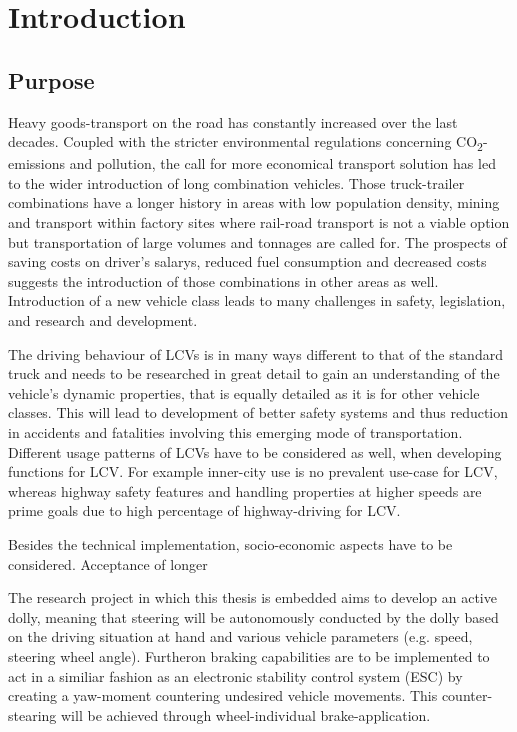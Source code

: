 \documentclass[ExampleMasters.tex]{subfiles}
\begin{document}
\clearpage	
\chapter{Introduction}
\label{chap:introduction}

\section{Purpose}
\label{sec:purpose}
Heavy goods-transport on the road has constantly increased over the last decades. Coupled with the stricter environmental regulations concerning CO\textsubscript{2}-emissions and pollution, the call for more economical transport solution has led to the wider introduction of long combination vehicles. Those truck-trailer combinations have a longer history in areas with low population density, mining and transport within factory sites where rail-road transport is not a viable option but transportation of large volumes and tonnages are called for. The prospects of saving costs on driver's salarys, reduced fuel consumption and decreased costs suggests the introduction of those combinations in other areas as well. Introduction of a new vehicle class leads to many challenges in safety, legislation, and research and development. 

The driving behaviour of LCVs is in many ways different to that of the standard truck and needs to be researched in great detail to gain an understanding of the vehicle's dynamic properties, that is equally detailed as it is for other vehicle classes. This will lead to development of better safety systems and thus reduction in accidents and fatalities involving this emerging mode of transportation. Different usage patterns of LCVs have to be considered as well, when developing functions for LCV. For example inner-city use is no prevalent use-case for LCV, whereas highway safety features and handling properties at higher speeds are prime goals due to high percentage of highway-driving for LCV.

Besides the technical implementation, socio-economic aspects have to be considered. Acceptance of longer 

The research project in which this thesis is embedded aims to develop an active dolly, meaning that steering will be autonomously conducted by the dolly based on the driving situation at hand and various vehicle parameters (e.g. speed, steering wheel angle). Furtheron braking capabilities are to be implemented to act in a similiar fashion as an electronic stability control system (ESC) by creating a yaw-moment countering undesired vehicle movements. This counter-stearing will be achieved through wheel-individual brake-application. 
\end{document}

